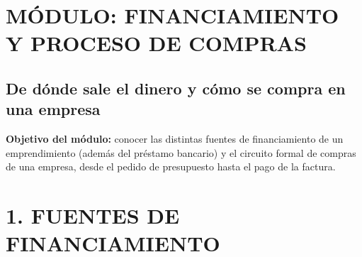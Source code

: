 \clearpage
\section*{MÓDULO: FINANCIAMIENTO Y PROCESO DE COMPRAS}
\subsection*{De dónde sale el dinero y cómo se compra en una empresa}

\begin{recuadro}
\textbf{Objetivo del módulo:} conocer las distintas fuentes de financiamiento de un
emprendimiento (además del préstamo bancario) y el circuito formal de compras de una empresa,
desde el pedido de presupuesto hasta el pago de la factura.
\end{recuadro}

\section*{1. FUENTES DE FINANCIAMIENTO}

